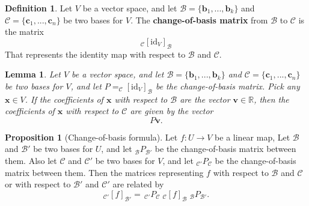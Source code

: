 \documentclass[11pt,a4paper]{article}
\newcommand\R{\mathbb{R}}
\newcommand\Bf{\mathcal{B}}
\newcommand\Cf{\mathcal{C}}
\newcommand\xb{\mathbf{x}}
\newcommand\bb{\mathbf{b}}
\newcommand\cb{\mathbf{c}}
\newcommand\vb{\mathbf{v}}
\newtheorem{lemma}{Lemma}
\theoremstyle{definition}
\newtheorem{definition}{Definition}
\newtheorem{proposition}{Proposition}
\begin{document}
\begin{definition}
    Let $ V $ be a vector space, and let $\Bf = \{\bb_1, ..., \bb_k\}$ and $\Cf = \{\cb_1, ..., \cb_n\}$ be two bases for $V$. 
    The \textbf{change-of-basis matrix} from $\Bf$ to $\Cf$ is the matrix
    \[_\Cf[\text{id}_V]_\Bf\]
    That represents the identity map with respect to $ \Bf $ and $ \Cf $.
\end{definition}

\begin{lemma}
    Let $ V $ be a vector space, and let $\Bf = \{\bb_1, ..., \bb_k\}$ and $\Cf = \{\cb_1, ..., \cb_n\}$ be two bases for $V$,
    and let $ P = _\Cf[\text{id}_V]_\Bf $ be the change-of-basis matrix. Pick any $ \xb \in V $. If the coefficients of $\xb$ with respect to $\Bf$ are the vector
    $\vb \in \R $, then the coefficients of $\xb$ with respect to $\Cf$ are given by the vector 
    \[P\vb.\]
\end{lemma}

\begin{proposition}[Change-of-basis formula]
   Let $ f : U \to V $ be a linear map, Let $ \Bf $ and $ \Bf'$ be two bases for $ U $, and let $ _\Bf P_{\Bf'} $ be the change-of-basis matrix between them. 
   Also let $ \Cf $ and $ \Cf'$ be two bases for $ V $, and let $ _{\Cf'}P_{\Cf} $ be the change-of-basis matrix between them. Then the matrices representing $ f $ with respect
   to $\Bf $ and $ \Cf $ or with respect to $ \Bf' $ and $ \Cf' $ are related by 
   \[ _{\Cf'} [f]_{\Bf'} = \, _{\Cf'}P_\Cf \; _\Cf [f]_\Bf \; _\Bf P_{\Bf'}.\]
   
\end{proposition}
\end{document}
